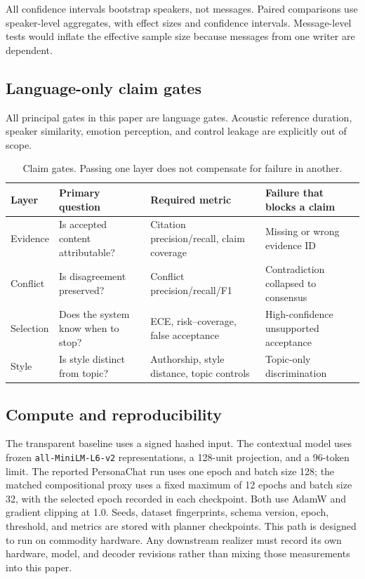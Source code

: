 \documentclass[11pt,a4paper]{article}
\begin{document}
All confidence intervals bootstrap speakers, not messages.  Paired comparisons
use speaker-level aggregates, with effect sizes and confidence intervals.
Message-level tests would inflate the effective sample size because messages
from one writer are dependent.

\subsection{Language-only claim gates}

All principal gates in this paper are language gates.  Acoustic reference
duration, speaker similarity, emotion perception, and control leakage are
explicitly out of scope.

\begin{table}[t]
\centering
\footnotesize
\begin{tabular}{p{1.7cm}p{4.0cm}p{4.0cm}p{4.5cm}}
\toprule
Layer & Primary question & Required metric & Failure that blocks a claim \\
\midrule
Evidence & Is accepted content attributable? & Citation precision/recall, claim coverage & Missing or wrong evidence ID \\
Conflict & Is disagreement preserved? & Conflict precision/recall/F1 & Contradiction collapsed to consensus \\
Selection & Does the system know when to stop? & ECE, risk--coverage, false acceptance & High-confidence unsupported acceptance \\
Style & Is style distinct from topic? & Authorship, style distance, topic controls & Topic-only discrimination \\
\bottomrule
\end{tabular}
\caption{Claim gates.  Passing one layer does not compensate for failure in
another.}
\label{tab:gates}
\end{table}

\subsection{Compute and reproducibility}

The transparent baseline uses a signed hashed input.  The contextual model uses
frozen \texttt{all-MiniLM-L6-v2} representations, a 128-unit projection, and a
96-token limit.  The reported PersonaChat run uses one epoch and batch size 128;
the matched compositional proxy uses a fixed maximum of 12 epochs and batch
size 32, with the selected epoch recorded in each checkpoint.  Both use AdamW
and gradient clipping at 1.0. Seeds,
dataset fingerprints, schema version, epoch, threshold, and metrics are stored
  with planner checkpoints.  This path is designed to run on commodity
  hardware.  Any downstream realizer must record its own hardware, model, and
  decoder revisions rather than mixing those measurements into this paper.
\end{document}
